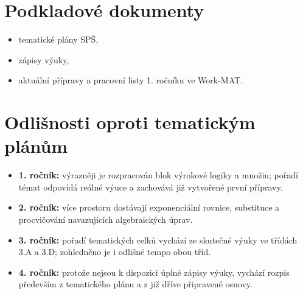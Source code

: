 \documentclass[10pt,a4paper]{article}
\begin{document}
\section*{Podkladové dokumenty}
\begin{itemize}\setlength{\itemsep}{2pt}
\item tematické plány SP\v{S},
\item zápisy výuky,
\item aktuální přípravy a pracovní listy 1. ročníku ve Work-MAT.
\end{itemize}

\section*{Odlišnosti oproti tematickým plánům}
\begin{itemize}\setlength{\itemsep}{2pt}
\item \textbf{1. ročník:} výrazněji je rozpracován blok výrokové logiky a množin; pořadí témat odpovídá reálné výuce a zachovává již vytvořené první přípravy.
\item \textbf{2. ročník:} více prostoru dostávají exponenciální rovnice, substituce a procvičování navazujících algebraických úprav.
\item \textbf{3. ročník:} pořadí tematických celků vychází ze skutečné výuky ve třídách 3.A a 3.D; zohledněno je i odlišné tempo obou tříd.
\item \textbf{4. ročník:} protože nejsou k dispozici úplné zápisy výuky, vychází rozpis především z tematického plánu a z již dříve připravené osnovy.
\end{itemize}
\clearpage
\end{document}
